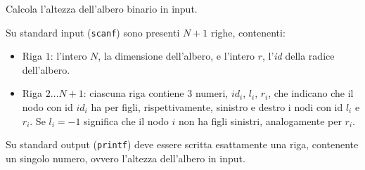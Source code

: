 \usepackage{xcolor}
\usepackage{afterpage}
\usepackage{pifont,mdframed}
\usepackage[bottom]{footmisc}


\renewcommand{\inputfile}{\texttt{stdin}}
\renewcommand{\outputfile}{\texttt{stdout}}
\makeatletter
\renewcommand{\this@inputfilename}{\texttt{stdin}}
\renewcommand{\this@outputfilename}{\texttt{stdout}}
\makeatother


\newenvironment{warning}
  {\par\begin{mdframed}[linewidth=2pt,linecolor=gray]%
    \begin{list}{}{\leftmargin=1cm
                   \labelwidth=\leftmargin}\item[\Large\ding{43}]}
  {\end{list}\end{mdframed}\par}


Calcola l'altezza dell'albero binario in input.



\InputFile
Su standard input (\texttt{scanf}) sono presenti $N+1$ righe, contenenti:
\begin{itemize}[nolistsep,itemsep=2mm]
\item Riga $1$: l'intero $N$, la dimensione dell'albero, e l'intero $r$,
l'\textit{id} della radice dell'albero.
\item Riga $2\dots N+1$: ciascuna riga contiene $3$ numeri, $id_i$, $l_i$, $r_i$,
che indicano che il nodo con id $id_i$ ha per figli, rispettivamente,
sinistro e destro i nodi con id $l_i$ e $r_i$. Se $l_i = -1$ significa
che il nodo $i$ non ha figli sinistri, analogamente per $r_i$.
\end{itemize}

\OutputFile
Su standard output (\texttt{printf}) deve essere scritta esattamente una riga,
contenente un singolo numero, ovvero l'altezza dell'albero in input.
	


